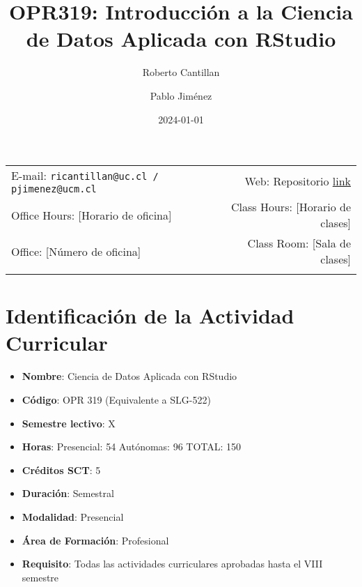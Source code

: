 \documentclass[11pt,letter,]{article}
\title{OPR319: Introducción a la Ciencia de Datos Aplicada con RStudio}
\author{Roberto Cantillan \and Pablo Jiménez}
\date{2024-01-01}
\providecommand{\tightlist}{%
  \setlength{\itemsep}{0pt}\setlength{\parskip}{0pt}}
\begin{document}
  

		\maketitle
		
	
		\thispagestyle{firststyle}



	\noindent \begin{tabular*}{\textwidth}{ @{\extracolsep{\fill}} lr @{\extracolsep{\fill}}}


E-mail: \texttt{ricantillan@uc.cl /
pjimenez@ucm.cl} & Web: Repositorio \href{https://github.com/rcantillan/OPR319-Ciencia-de-datos-con-R}{link}\\
Office Hours: {[}Horario de oficina{]}  &  Class Hours: {[}Horario de
clases{]}\\
Office: {[}Número de oficina{]}  & Class Room: {[}Sala de clases{]}\\
	&  \\
	\hline
	\end{tabular*}
	
\vspace{2mm}
	


\hypertarget{identificaciuxf3n-de-la-actividad-curricular}{%
\section{Identificación de la Actividad
Curricular}\label{identificaciuxf3n-de-la-actividad-curricular}}

\begin{itemize}
\tightlist
\item
  \textbf{Nombre}: Ciencia de Datos Aplicada con RStudio
\item
  \textbf{Código}: OPR 319 (Equivalente a SLG-522)
\item
  \textbf{Semestre lectivo}: X
\item
  \textbf{Horas}: Presencial: 54 \textbar{} Autónomas: 96 \textbar{}
  TOTAL: 150
\item
  \textbf{Créditos SCT}: 5
\item
  \textbf{Duración}: Semestral
\item
  \textbf{Modalidad}: Presencial
\item
  \textbf{Área de Formación}: Profesional
\item
  \textbf{Requisito}: Todas las actividades curriculares aprobadas hasta
  el VIII semestre
\end{itemize}
\end{document}
